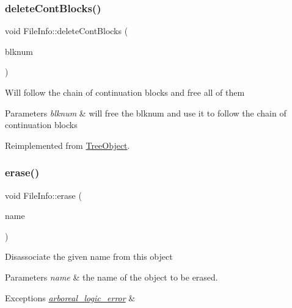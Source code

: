 \mbox{\label{classFileInfo_a530a418e213a0a945b75ee1dcb8f6acb}} 
\subsubsection{\texorpdfstring{delete\+Cont\+Blocks()}{deleteContBlocks()}}
{\footnotesize\ttfamily void File\+Info\+::delete\+Cont\+Blocks (\begin{DoxyParamCaption}\item[{Blk\+Num\+Type}]{blknum }\end{DoxyParamCaption})\hspace{0.3cm}{\ttfamily [virtual]}}

Will follow the chain of continuation blocks and free all of them 
\begin{DoxyParams}{Parameters}
{\em blknum} & will free the blknum and use it to follow the chain of continuation blocks \\
\hline
\end{DoxyParams}


Reimplemented from \mbox{\hyperlink{classTreeObject_a74c73604c877bec03f6188147af7c509}{Tree\+Object}}.

\mbox{\label{classFileInfo_ae058242283d3317eaf2b79428e6137f6}} 
\subsubsection{\texorpdfstring{erase()}{erase()}}
{\footnotesize\ttfamily void File\+Info\+::erase (\begin{DoxyParamCaption}\item[{string}]{name }\end{DoxyParamCaption})\hspace{0.3cm}{\ttfamily [virtual]}}

Disassociate the given name from this object 
\begin{DoxyParams}{Parameters}
{\em name} & the name of the object to be erased. \\
\hline
\end{DoxyParams}

\begin{DoxyExceptions}{Exceptions}
{\em \mbox{\hyperlink{classarboreal__logic__error}{arboreal\+\_\+logic\+\_\+error}}} & \\
\hline
\end{DoxyExceptions}


